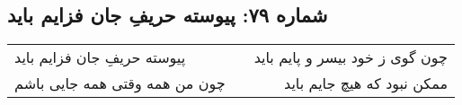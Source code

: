 \begin{center}
\section*{شماره ۷۹: پیوسته حریفِ جان فزایم باید}
\label{sec:079}
\begin{longtable}{l p{0.5cm} r}
پیوسته حریفِ جان فزایم باید
&&
چون گوی ز خود بیسر و پایم باید
\\
چون من همه وقتی همه جایی باشم
&&
ممکن نبود که هیچ جایم باید
\\
\end{longtable}
\end{center}
